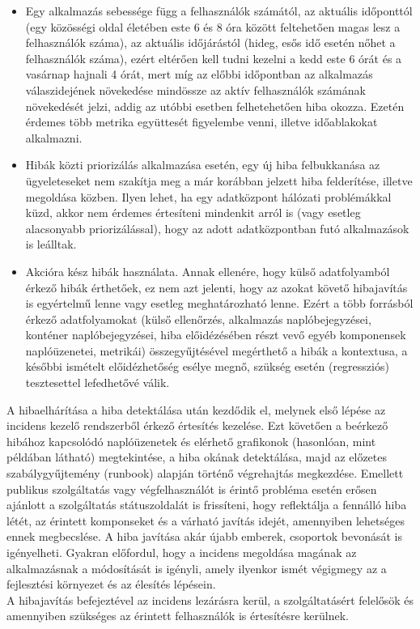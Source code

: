 \begin{itemize}
  \item Egy alkalmazás sebessége függ a felhasználók számától, az aktuális időponttól (egy közösségi oldal életében este 6 és 8 óra között feltehetően magas lesz a felhasználók száma), az aktuális időjárástól (hideg, esős idő esetén nőhet a felhasználók száma), ezért eltérően kell tudni kezelni a kedd este 6 órát és a vasárnap hajnali 4 órát, mert míg az előbbi időpontban az alkalmazás válaszidejének növekedése mindössze az aktív felhasználók számának növekedését jelzi, addig az utóbbi esetben felhetehetően hiba okozza. Ezetén érdemes több metrika együttesét figyelembe venni, illetve időablakokat alkalmazni.
  \item Hibák közti priorizálás alkalmazása esetén, egy új hiba felbukkanása az ügyeleteseket nem szakítja meg a már korábban jelzett hiba felderítése, illetve megoldása közben. Ilyen lehet, ha egy adatközpont hálózati problémákkal küzd, akkor nem érdemes értesíteni mindenkit arról is (vagy esetleg alacsonyabb priorizálással), hogy az adott adatközpontban futó alkalmazások is leálltak.
  \item Akcióra kész hibák használata. Annak ellenére, hogy külső adatfolyamból érkező hibák érthetőek, ez nem azt jelenti, hogy az azokat követő hibajavítás is egyértelmű lenne vagy esetleg meghatározható lenne. Ezért a több forrásból érkező adatfolyamokat (külső ellenőrzés, alkalmazás naplóbejegyzései, konténer naplóbejegyzései, hiba előidézésében részt vevő egyéb komponensek naplóüzenetei, metrikái) összegyűjtésével megérthető a hibák a kontextusa, a későbbi ismételt előidézhetőség esélye megnő, szükség esetén (regressziós) tesztesettel lefedhetővé válik.
\end{itemize}

A hibaelhárítása a hiba detektálása után kezdődik el, melynek első lépése az incidens kezelő rendszerből érkező értesítés kezelése. Ezt követően a beérkező hibához kapcsolódó naplóüzenetek és elérhető grafikonok (hasonlóan, mint  példában látható) megtekintése, a hiba okának detektálása, majd az előzetes szabálygyűjtemény (runbook) alapján történő végrehajtás megkezdése.
Emellett publikus szolgáltatás vagy végfelhasználót is érintő probléma esetén erősen ajánlott a szolgáltatás státuszoldalát is frissíteni, hogy reflektálja a fennálló hiba létét, az érintett komponseket és a várható javítás idejét, amennyiben lehetséges ennek megbecslése. A hiba javítása akár újabb emberek, csoportok bevonását is igényelheti. Gyakran előfordul, hogy a incidens megoldása magának az alkalmazásnak a módosítását is igényli, amely ilyenkor ismét végigmegy az a fejlesztési környezet és az élesítés lépésein.\hfill\\
A hibajavítás befejeztével az incidens lezárásra kerül, a szolgáltatásért felelősök és  amennyiben szükséges az érintett felhasználók is értesítésre kerülnek.

